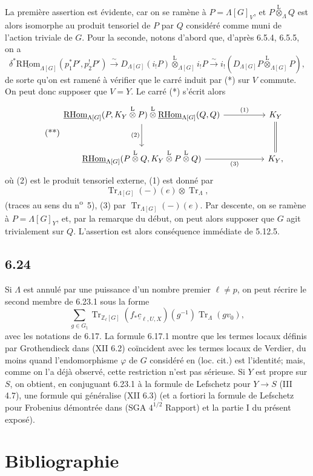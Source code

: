 \documentclass[11pt]{article}
\newcommand{\R}{\mathrm{R}}\newcommand{\RHomCore}{\mathrm{RHom}}
\providecommand{\RHom}{\RHomCore}
\providecommand{\uRHom}{\underline{\RHom}}
\providecommand{\Tr}{\operatorname{Tr}}
\providecommand{\Tr}{\operatorname{Tr}}
\providecommand{\lten}{\overset{\mathrm L}{\otimes}}
\providecommand{\Tr}{\operatorname{Tr}}
\providecommand{\RHom}{\RHomCore}
\providecommand{\lten}{\overset{\mathrm L}{\otimes}}
\providecommand{\RHom}{\R\mathcal{H}om}
\providecommand{\lten}{\overset{\mathrm L}{\otimes}}
\providecommand{\R}{\mathrm R}
\providecommand{\Tr}{\operatorname{Tr}}
\providecommand{\lten}{\overset{\mathrm L}{\otimes}}
\providecommand{\lten}{\overset{\mathrm L}{\otimes}}
\providecommand{\lten}{\overset{\mathrm L}{\otimes}}
\providecommand{\RHom}{\RHomCore}
\providecommand{\Tr}{\operatorname{Tr}}
\providecommand{\lten}{\overset{\mathrm L}{\otimes}}
\begin{document}
La première assertion est évidente, car on se ramène à $P=\Lambda[G]_V$, et $P\lten_{\Lambda}Q$ est alors isomorphe au produit tensoriel de $P$ par $Q$ considéré comme muni de l'action triviale de $G$. Pour la seconde, notons d'abord que, d'après 6.5.4, 6.5.5, on a
\[
\delta^*\uRHom_{\Lambda[G]}(p_1^*P',p_2^!P')
\xrightarrow{\sim}
D_{\Lambda[G]}(i_!P)\lten_{\Lambda[G]} i_!P
\xrightarrow{\sim}
i_!(D_{\Lambda[G]}P\lten_{\Lambda[G]}P),
\]
de sorte qu'on est ramené à vérifier que le carré induit par (*) sur $V$ commute. On peut donc supposer que $V=Y$. Le carré (*) s'écrit alors
\begin{equation}
\tag{**}
\begin{tikzcd}[column sep=huge,row sep=large]
\uRHom_{\Lambda[G]}(P,K_Y\lten P)\lten\uRHom_{\Lambda[G]}(Q,Q)
  \arrow[r,"(1)"] \arrow[d,"(2)"']
& K_Y \arrow[d,equal]\\
\uRHom_{\Lambda[G]}(P\lten Q,K_Y\lten P\lten Q) \arrow[r,"(3)"']
& K_Y ,
\end{tikzcd}
\end{equation}
où (2) est le produit tensoriel externe, (1) est donné par
\[
\Tr_{\Lambda[G]}(-)(e)\otimes\Tr_{\Lambda},
\]
(traces au sens du n\textsuperscript{o}~5), (3) par $\Tr_{\Lambda[G]}(-)(e)$. Par descente, on se ramène à $P=\Lambda[G]_Y$, et, par la remarque du début, on peut alors supposer que $G$ agit trivialement sur $Q$. L'assertion est alors conséquence immédiate de 5.12.5.

\subsection*{6.24}
Si $\Lambda$ est annulé par une puissance d'un nombre premier $\ell\ne p$, on peut récrire le second membre de 6.23.1 sous la forme
\[
\sum_{g\in G_{\natural}}
\Tr_{\mathbb Z_{\ell}[G]}(f_*\underline c_{\ell,U,X})(g^{-1})
\Tr_{\Lambda}(gv_0),
\]
avec les notations de 6.17. La formule 6.17.1 montre que les termes locaux définis par Grothendieck dans (XII 6.2) coïncident avec les termes locaux de Verdier, du moins quand l'endomorphisme $\varphi$ de $G$ considéré en (loc. cit.) est l'identité; mais, comme on l'a déjà observé, cette restriction n'est pas sérieuse. Si $Y$ est propre sur $S$, on obtient, en conjuguant 6.23.1 à la formule de Lefschetz pour $Y\to S$ (III 4.7), une formule qui généralise (XII 6.3) (et a fortiori la formule de Lefschetz pour Frobenius démontrée dans (SGA $4^{1/2}$ Rapport) et la partie I du présent exposé).

\section*{Bibliographie}
\end{document}
